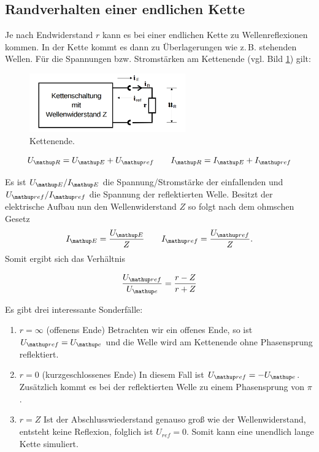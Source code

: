 \subsection{Randverhalten einer endlichen Kette}
Je nach Endwiderstand $r$ kann es bei einer endlichen Kette
zu Wellenreflexionen kommen. In der Kette kommt es dann %
zu Überlagerungen wie z.\,B. stehenden Wellen. %
Für die Spannungen bzw. Stromstärken am Kettenende (vgl. Bild \ref{fig:kettenende}) gilt:%

\begin{figure}
  \centering
  \includegraphics[width=0.6\textwidth]{bilder/wellenwiderstand.png}
  \caption{Kettenende.\cite{anleitung356}}
  \label{fig:kettenende}
\end{figure}

\begin{equation*}
U\ua{R}=U\ua{E}+U\ua{ref} \qquad I\ua{R}=I\ua{E}+I\ua{ref}
\end{equation*}

Es ist $U\ua{E}/I\ua{E}$ die Spannung/Stromstärke der einfallenden und $U\ua{ref}/I\ua{ref}$ die Spannung der reflektierten
Welle. Besitzt der elektrische Aufbau nun den Wellenwiderstand $Z$ so folgt nach dem
ohmschen Gesetz
\begin{equation*}
I\ua{E}=\frac{U\ua{E}}{Z} \qquad I\ua{ref}=\frac{U\ua{ref}}{Z}.
\end{equation*}
Somit ergibt sich das Verhältnis

\begin{equation*}
\frac{U\ua{ref}}{U\ua{e}}=\frac{r-Z}{r+Z}
\end{equation*}

Es gibt drei interessante Sonderfälle:

\renewcommand{\labelenumi}{\alph{enumi})}
\begin{enumerate}
\item{ $r=\infty$ (offenens Ende) \newline
Betrachten wir ein offenes Ende, so ist $U\ua{ref}=U\ua{e}$ und die Welle wird am Kettenende ohne Phasensprung reflektiert.} %
\item{ $r=0$ (kurzgeschlossenes Ende) \newline
In diesem Fall ist $U\ua{ref}=-U\ua{e}$. Zusätzlich kommt es bei der reflektierten Welle zu einem Phasensprung von $\pi$.} %
\item{ $r=Z$ \newline
Ist der Abschlusswiederstand genauso groß wie der Wellenwiderstand, entsteht keine Reflexion, folglich
ist $U_{ref}=0$. Somit kann eine unendlich lange Kette simuliert.}
\end{enumerate}

